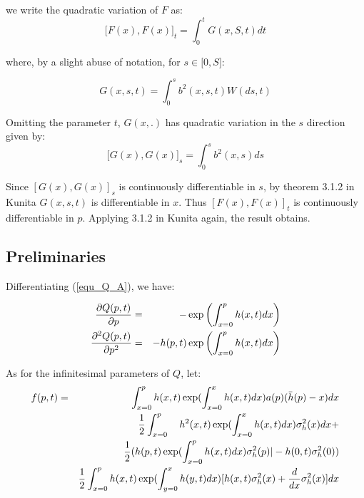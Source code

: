 \documentclass{article}
\begin{document}
we write the quadratic variation of $F$ as:%
\begin{equation*}
\lbrack F(x),F(x)]_{t}=\int_{0}^{t}G(x,S,t)dt
\end{equation*}

where, by a slight abuse of notation, for $s\in \lbrack 0,S]$:

\begin{equation*}
G(x,s,t)=\int_{0}^{s}b^{2}(x,s,t)W(ds,t)
\end{equation*}

Omitting the parameter $t$, $G(x,.)$ has quadratic variation in the $s$
direction given by:%
\begin{equation*}
\lbrack G(x),G(x)]_{s}=\int_{0}^{s}b^{2}(x,s)ds
\end{equation*}

Since $[G(x),G(x)]_{s}$ is continuously differentiable in $s$, by theorem
3.1.2 in Kunita $G(x,s,t)$ is differentiable in $x$. Thus $[F(x),F(x)]_{t}$
is continuously differentiable in $p$. Applying 3.1.2 in Kunita again, the
result obtains.

\subsection{Preliminaries}

Differentiating (\ref{equ_Q_A}), we have:

\begin{eqnarray}
\frac{\partial Q(p,t)}{\partial p} &=&-\exp \left( {\int_{x=0}^{p}h(x,t)dx}%
\right)   \label{dQdp_3} \\
\frac{\partial ^{2}Q(p,t)}{\partial p^{2}} &=&-{h(p,t)}\exp \left( {%
\int_{x=0}^{p}h(x,t)dx}\right)   \label{dQdp_2_3}
\end{eqnarray}

As for the infinitesimal parameters of $Q$, let:%
\begin{eqnarray}
f(p,t) &=&\int_{x=0}^{p}{h(x,t)}\exp ({\int_{x=0}^{x}h(x,t)dx)}a(p)(\bar{h}%
(p)-x)dx  \label{f_of_p} \\
&&\frac{1}{2}\int_{x=0}^{p}\text{ }{h}^{2}{(x,t)}\exp ({%
\int_{x=0}^{x}h(x,t)dx)}\sigma _{h}^{2}(x)dx+  \notag \\
&&\frac{1}{2}({h(p,t)}\exp ({\int_{x=0}^{p}h(x,t)dx)}\sigma _{h}^{2}(p)|-{%
h(0,t)}\sigma _{h}^{2}(0))  \notag \\
&&\frac{1}{2}\int_{x=0}^{p}{h(x,t)}\exp ({\int_{y=0}^{x}h(y,t)dx)[h(x,t)}%
\sigma _{h}^{2}(x)+\frac{d}{dx}\sigma _{h}^{2}(x)]dx  \notag
\end{eqnarray}
\end{document}
